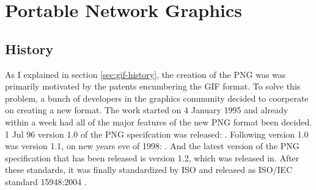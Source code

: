 \begin{comment}
  
\end{comment}

\chapter{Portable Network Graphics}
\label{cha:png}

\section{History}

As I explained in section \ref{sec:gif-history}, the creation of the
PNG was was primarily motivated by the patents encumbering the GIF
format. To solve this problem, a bunch of developers in the graphics
community decided to coorperate on creating a new format. The work
started on 4 January 1995 and already within a week had all of the
major features of the new PNG format been decided. 1 Jul 96 version
1.0 of the PNG specifcation was released:
\cite{boutel:_png_portab_networ_graph_specif_version1}. Following
version 1.0 was version 1.1, on new years eve of 1998:
\cite{boutel:_png_portab_networ_graph_specif_version11}. And the
latest version of the PNG specification that has been released is
version 1.2, which was released in. After these standards, it was
finally standardized by ISO and released as ISO/IEC standard
15948:2004 \cite{iso/eic04:_iso_iec_png,roelofs09:_histor_portab_networ_graph_png_format,roelofs99:_png,roelofs:_portab_networ_graph_main}.

  \cite{sivonen:_sad_story_png_gamma_correc}



